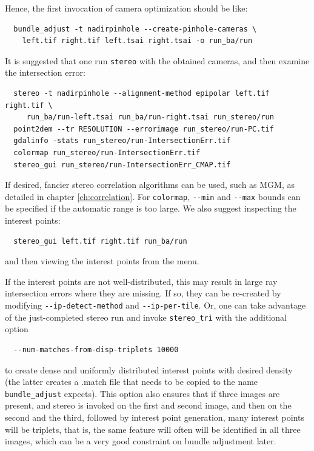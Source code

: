 Hence, the first invocation of camera optimization should be like:

\begin{verbatim}
  bundle_adjust -t nadirpinhole --create-pinhole-cameras \
    left.tif right.tif left.tsai right.tsai -o run_ba/run
\end{verbatim}

It is suggested that one run \texttt{stereo} with the obtained cameras, 
and then examine the intersection error:

\begin{verbatim}
  stereo -t nadirpinhole --alignment-method epipolar left.tif right.tif \
     run_ba/run-left.tsai run_ba/run-right.tsai run_stereo/run 
  point2dem --tr RESOLUTION --errorimage run_stereo/run-PC.tif
  gdalinfo -stats run_stereo/run-IntersectionErr.tif
  colormap run_stereo/run-IntersectionErr.tif
  stereo_gui run_stereo/run-IntersectionErr_CMAP.tif
\end{verbatim}

If desired, fancier stereo correlation algorithms can be used, such as MGM, as detailed in  
chapter \ref{ch:correlation}. For \texttt{colormap}, \texttt{-\/-min} and \texttt{-\/-max} 
bounds can be specified if the automatic range is too large. We also suggest inspecting
the interest points:
\begin{verbatim}
  stereo_gui left.tif right.tif run_ba/run
\end{verbatim}
and then viewing the interest points from the menu. 

If the interest points are not well-distributed, this may result in large ray intersection errors
where they are missing. If so, they can be re-created by modifying \texttt{-\/-ip-detect-method}
and \texttt{-\/-ip-per-tile}. Or, one can take advantage of the just-completed stereo run
and invoke \texttt{stereo\_tri} with the additional option 
\begin{verbatim} 
  --num-matches-from-disp-triplets 10000
\end{verbatim}

to create dense and uniformly distributed interest points with desired density
(the latter creates a .match file that needs to be copied to the name
\texttt{bundle\_adjust} expects). This option also ensures that if three
images are present, and stereo is invoked on the first and second image,
and then on the second and the third, followed by interest point generation,
many interest points will be triplets, that is, the same feature will often
will be identified in all three images, which
can be a very good constraint on bundle adjustment later.

